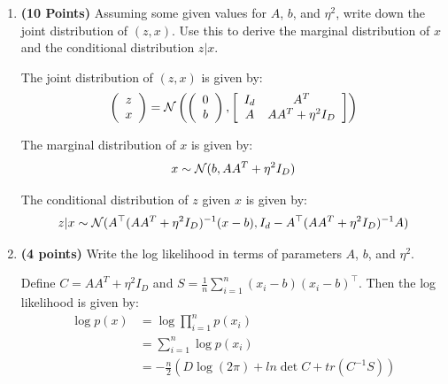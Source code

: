 \begin{enumerate}
\item \textbf{(10 Points)}
Assuming some given values for $A$, $b$, and $\eta^2$, write down the joint distribution of $(z,x)$. Use this to derive the marginal
distribution of $x$ and the conditional distribution $z|x$. 

\begin{soln}
  The joint distribution of $(z,x)$ is given by:
  \begin{align*}
    \left(\begin{array}{c}z \\ x\end{array}\right) =
  \mathcal{N} \left( \left(\begin{array}{c} 0 \\ b \end{array} \right), 
  \left[ \begin{array}{cc} I_d & A^T \\ A &
    AA^T + \eta^2 I_D \end{array} \right] 
  \right)
  \end{align*}

  The marginal distribution of $x$ is given by:
  \begin{align*}
    x \sim \mathcal{N}(b, AA^T + \eta^2 I_D)
  \end{align*}

  The conditional distribution of $z$ given $x$ is given by:
  \begin{align*}
    z | x \sim \mathcal{N}(A^\top (AA^T + \eta^2 I_D)^{-1} (x - b), I_d - A^\top (AA^T + \eta^2 I_D)^{-1} A)
  \end{align*}
\end{soln}

\item \textbf{(4 points)}
Write the log likelihood in terms of parameters $A$, $b$, and $\eta^2$.

\begin{soln}
  Define $C = AA^T + \eta^2 I_D$ and $S = \frac{1}{n} \sum_{i=1}^n (x_i - b)(x_i -b)^\top$. Then the log likelihood is given by:
  \begin{align*}
    \log p(x) &= \log \prod_{i=1}^n p(x_i) \\
    &= \sum_{i=1}^n \log p(x_i) \\
    &= -\frac{n}{2} (D \log (2\pi) + ln \det C + tr(C^{-1} S)) \\
  \end{align*}
\end{soln}


\end{enumerate}
